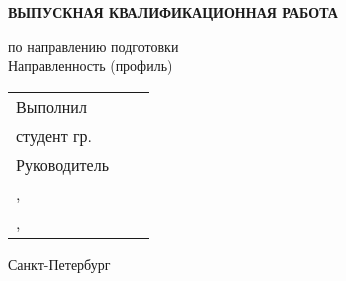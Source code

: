 \vspace{0pt plus2fill} %


{\centering%
	
	\MakeUppercase{\bfseries{}Выпускная квалификационная работа} \\ 
	\MakeUppercase{\thesisDegree}%


{\centering%
	\MakeUppercase{\bfseries{\thesisTitle}}}%

}\par%

\noindent	по направлению подготовки \thesisSpecialtyCodeAndTitle{}\\%
\noindent	Направленность (профиль)	\thesisOPCodeAndTitle %
\par%





\vspace{4mm plus2fill}%

\noindent
\begin{tabularx}{\linewidth}{lXl}
	Выполнил              &	   &             \\
	студент гр.~\group     &    & \Author     \\[\mfloatsep]

	Руководитель 		  &    &             \\
	\SupervisorJob,		  &    &             \\
	\SupervisorDegree, \SupervisorTitle%
	 	  &    & \Supervisor \\[\mfloatsep]
	
	
\end{tabularx} %


%
\vspace{0pt plus4fill}%


\begin{center}%
Санкт-Петербург\\
\thesisYear
\end{center}%
\restoregeometry
\newpage